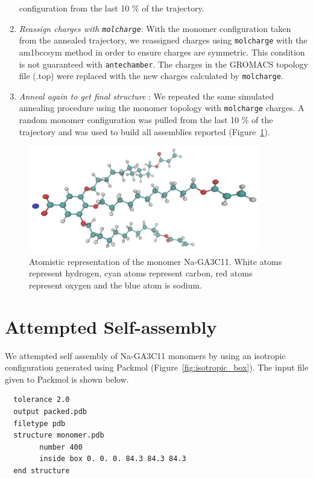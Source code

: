 \documentclass{article}
\begin{document}
\begin{enumerate}
	configuration from the last 10 \% of the trajectory. 
	\item \textit{Reassign charges with \texttt{molcharge}}: With the monomer
	configuration taken from the annealed trajectory, we reassigned charges using
	\texttt{molcharge} with the am1bccsym method in order to ensure charges 
	are symmetric. This condition is not guaranteed with \texttt{antechamber}. 
	The charges in the GROMACS topology file (.top) were replaced with the 
	new charges calculated by \texttt{molcharge}. 
	\item \textit{Anneal again to get final structure} : We repeated the
	same simulated annealing procedure using the monomer topology with
	\texttt{molcharge} charges. A random monomer configuration was pulled from the
	last 10 \% of the trajectory and was used to build all assemblies reported
	(Figure~\ref{fig:monomer}).
  \end{enumerate} 
  \clearpage
  \begin{figure}[!htb]
	\centering
        \includegraphics[width=0.9\textwidth]{monomer.png}
	\caption{Atomistic representation of the monomer Na-GA3C11. White atoms
		represent hydrogen, cyan atoms represent carbon, red atoms represent oxygen and
		the blue atom is sodium.}\label{fig:monomer}
  \end{figure}
  
  \section{Attempted Self-assembly}\label{section:self_assembly}
  
  We attempted self assembly of Na-GA3C11 monomers by using an isotropic configuration
  generated using Packmol \cite{martinez_packmol:_2009} (Figure~\ref{fig:isotropic_box}).
  The input file given to Packmol is shown below.
  
  \lstset{language=bash}
  \begin{lstlisting}
  tolerance 2.0
  output packed.pdb
  filetype pdb
  structure monomer.pdb
  		number 400
  		inside box 0. 0. 0. 84.3 84.3 84.3
  end structure
  \end{lstlisting}
\end{document}
